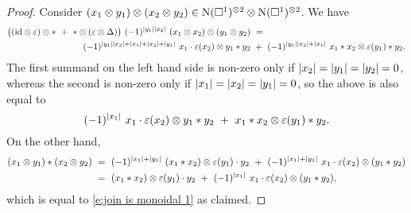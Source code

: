 \begin{proof}
	Consider $(x_1 \otimes y_1) \otimes (x_2 \otimes y_2) \in \operatorname{N}(\square^1)^{\otimes 2} \otimes \operatorname{N}(\square^1)^{\otimes 2}$.
	We have
	\begin{equation*}
	\begin{split}
	\big((\id \otimes \varepsilon) \otimes \ast \ + \ \ast \otimes (\varepsilon \otimes \Delta)\big) \ (-1)^{\bars{y_1} \bars{x_2}} \ (x_1 \otimes x_2) \otimes (y_1 \otimes y_2) \ & = \\
	(-1)^{\bars{y_1} \bars{x_2} + \bars{x_1} + \bars{x_2} + \bars{y_1}} \ x_1 \cdot \varepsilon(x_2) \otimes y_1 \ast y_2 \ & + \ 
	(-1)^{\bars{y_1} \bars{x_2} + \bars{x_1}} \ x_1 \ast x_2 \otimes \varepsilon(y_1) \ast y_2.
	\end{split}
	\end{equation*}
	The first summand on the left hand side is non-zero only if $\vert{x_2}\vert = \vert{y_1}\vert = \vert{y_2}\vert = 0$, whereas the second is non-zero only if $\vert{x_1}\vert = \vert{x_2}\vert = \vert{y_1}\vert = 0$, so the above is also equal to
	\begin{equation} \label{e:join is monoidal 1}
	(-1)^{\bars{x_1}} \ x_1 \cdot \varepsilon(x_2) \otimes y_1 \ast y_2 \ + \ 
	x_1 \ast x_2 \otimes \varepsilon(y_1) \ast y_2.
	\end{equation}
	On the other hand,
	\begin{align*}
	(x_1 \otimes y_1) \ast (x_2 \otimes y_2) \ & =\ 
	(-1)^{\bars{x_1} + \bars{y_1}} \ (x_1 \ast x_2) \otimes \varepsilon(y_1) \cdot y_2 \ +\
	(-1)^{\bars{x_1} + \bars{y_1}} \ x_1 \cdot \varepsilon(x_2) \otimes (y_1 \ast y_2) \\ \ & =\ 
	(x_1 \ast x_2) \otimes \varepsilon(y_1) \cdot y_2 \ +\
	(-1)^{\bars{x_1}} \ x_1 \cdot \varepsilon(x_2) \otimes (y_1 \ast y_2),
	\end{align*}
	which is equal to \eqref{e:join is monoidal 1} as claimed.
\end{proof}

